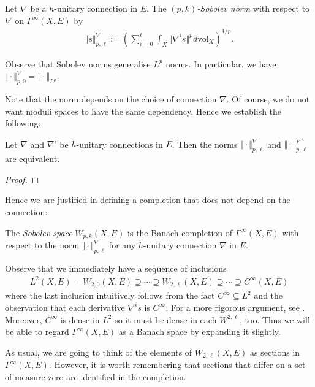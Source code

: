 \documentclass[12pt]{ociamthesis}  %
\begin{document}
\begin{definition}
  Let $\nabla$ be a $h$-unitary connection in $E$.
  The \emph{$(p,k)$-Sobolev norm} with respect to $\nabla$ on
  $\Gamma^\infty(X,E)$ by
  \begin{align*}
    \Vert s\Vert_{p,\ell}^\nabla := \left(
    \sum_{i=0}^\ell \int_X \Vert \nabla^i s \Vert^p d\text{vol}_X
    \right)^{1/p}.
  \end{align*}
\end{definition}
\begin{example}
  Observe that Sobolev norms generalise $L^p$ norms. In particular,
  we have $\Vert\cdot\Vert^\nabla_{p,0} = \Vert\cdot\Vert_{L^p}$.
\end{example}
Note that the norm depends on the choice of connection $\nabla$. Of
course, we do not want moduli spaces to have the same dependency. Hence
we establish the following:
\begin{lemma}
  Let $\nabla$ and $\nabla'$ be $h$-unitary connections in $E$. Then the
  norms $\Vert\cdot\Vert_{p,\ell}^\nabla$ and
  $\Vert\cdot\Vert_{p,\ell}^{\nabla'}$ are equivalent.
  \begin{proof}
    \missingproof
  \end{proof}
\end{lemma}

Hence we are justified in defining a completion that does not depend
on the connection:

\begin{definition}
  The \emph{Sobolev space} $W_{p,k}(X,E)$ is the Banach completion of
  $\Gamma^\infty(X,E)$ with respect to the norm
  $\Vert\cdot\Vert_{p,\ell}^\nabla$ for any $h$-unitary connection
  $\nabla$ in $E$.
\end{definition}

Observe that we immediately have a sequence of inclusions
\begin{align*}
  L^2(X,E) =
  W_{2,0}(X,E) \supseteq
  \cdots \supseteq
  W_{2,\ell}(X,E) \supseteq
  \cdots
  \supseteq
  C^\infty(X,E)
\end{align*}
where the last inclusion intuitively follows from the fact
$C^\infty \subseteq L^2$ and the observation that each derivative
$\nabla^i s$ is $C^\infty$. For a more rigorous argument, see
\cite[Corollary 3.8.3]{bc2009}.
Moreover, $C^\infty$ is dense in $L^2$ so it must be dense in each
$W^{2,\ell}$, too. Thus we will be able to regard $\Gamma^\infty(X,E)$
as a Banach space by expanding it slightly.

As usual, we are going to think of the elements of $W_{2,\ell}(X,E)$ as
sections in $\Gamma^\infty(X,E)$. However, it is worth remembering that
sections that differ on a set of measure zero are identified in the
completion.
\end{document}
